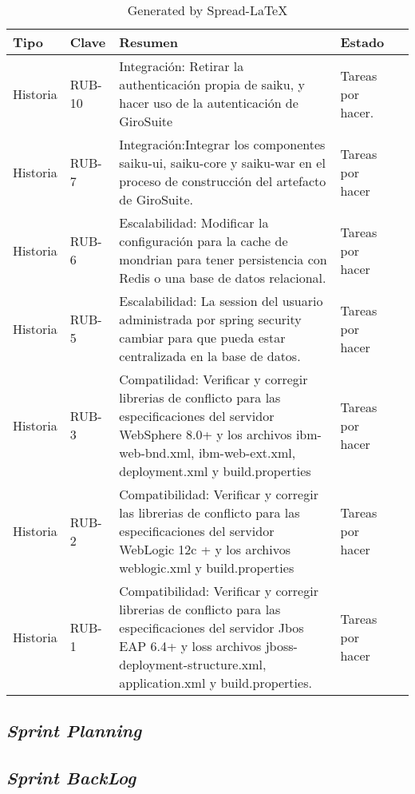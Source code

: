 \begin{spacing}{1.5}
	\begin{table}[H]\centering
		\caption{Generated by Spread-LaTeX}\label{tab: }
		\scriptsize
		\begin{tabular}{ |p{2cm}|p{22cm|}|p{9cm|}|p{12cm|}|p{2cm|}| }
			\hline
			\rowcolor[HTML]{CBCEFB} 
		\textbf{Tipo} &\textbf{Clave} &\textbf{Resumen} &\textbf{Estado}\\ \hline
			Historia &RUB-10 &Integración: Retirar la authenticación propia de saiku, y hacer uso de la autenticación de GiroSuite &Tareas por hacer. \\\hline
			Historia &RUB-7 &Integración:Integrar los componentes saiku-ui, saiku-core y saiku-war en el proceso de construcción del artefacto de GiroSuite. &Tareas por hacer  \\\hline
			Historia &RUB-6 &Escalabilidad: Modificar la configuración para la cache de mondrian para tener persistencia con Redis o una base de datos relacional. &Tareas por hacer \\\hline
			Historia &RUB-5 &Escalabilidad: La session del usuario administrada por spring security cambiar para que pueda estar centralizada en la base de datos. &Tareas por hacer  \\\hline
			Historia &RUB-3 &Compatilidad: Verificar y corregir librerias de conflicto para las especificaciones del servidor WebSphere 8.0+ y los archivos ibm-web-bnd.xml, ibm-web-ext.xml, deployment.xml y build.properties &Tareas por hacer  \\\hline
			Historia &RUB-2 &Compatibilidad: Verificar y corregir las librerias de conflicto para las especificaciones del servidor WebLogic 12c + y los archivos weblogic.xml y build.properties &Tareas por hacer  \\\hline
			Historia &RUB-1 &Compatibilidad: Verificar y corregir librerias de conflicto para las especificaciones del servidor Jbos EAP 6.4+ y loss archivos jboss-deployment-structure.xml, application.xml y build.properties. &Tareas por hacer  \\\hline
		\end{tabular}
	\end{table}

	\subsection{\textit{Sprint Planning}}
	\subsection{\textit{Sprint BackLog}}

\end{spacing}
